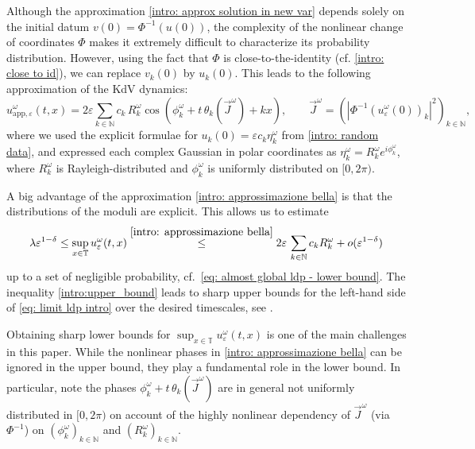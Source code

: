 \documentclass[a4paper,10pt,reqno]{article}
\theoremstyle{definition}
\theoremstyle{plain}
\theoremstyle{plain}
\theoremstyle{definition}
\theoremstyle{plain}
\theoremstyle{plain}
\theoremstyle{plain}
\theoremstyle{definition}
\theoremstyle{definition}
\def \N{\mathbb N}
\def \T{\mathbb{T}}
\begin{document}
Although the approximation \eqref{intro: approx solution in new var} depends solely on the initial datum $v(0)=\Phi^{-1}(u(0))$, the complexity of the nonlinear change of coordinates $\Phi$ makes it extremely difficult to characterize its probability distribution. However, using the fact that $\Phi$ is close-to-the-identity (cf. \eqref{intro: close to id}), we can replace $v_k(0)$ by $u_k(0)$. This leads to the following approximation of the KdV dynamics:
\begin{equation} \label{intro: approssimazione bella}
u_{\mathrm{app},\varepsilon}^{\omega}(t,x) = 2 \varepsilon \sum_{k \in \N} c_k \, R_k^{\omega} \cos \left ( \phi_k^{\omega} + t \,\theta_k( \vec{J}^{\omega}) + kx \right ), \qquad \vec{J}^{\omega} = ( |\Phi^{-1} (u_{\varepsilon}^{\omega}(0))_k|^2 )_{k\in\N},
\end{equation}
where we used the explicit formulae for $u_k(0) = \varepsilon c_k \eta_k^{\omega}$ from \eqref{intro: random data}, and expressed each complex Gaussian in polar coordinates as $\eta_k^{\omega}=R_k^{\omega} e^{i\phi_k^{\omega}}$, where $R_k^{\omega}$ is Rayleigh-distributed and $\phi_k^{\omega}$ is uniformly distributed on $[0,2\pi)$.

A big advantage of the approximation \eqref{intro: approssimazione bella} is that the distributions of the moduli are explicit. This allows us to estimate
\begin{equation}\label{intro:upper_bound}
\lambda \varepsilon^{1-\delta}\leq \sup_{x\in\T} u^{\omega}_{\varepsilon}(t,x) \stackrel{\eqref{intro: approssimazione bella}}{\leq} 2\varepsilon\,\sum_{k\in\N} c_k R_k^{\omega} + o(\varepsilon^{1-\delta})
\end{equation}
up to a set of negligible probability, cf.~\eqref{eq: almost global ldp - lower bound}. The inequality \eqref{intro:upper_bound} leads to sharp upper bounds for the left-hand side of \eqref{eq: limit ldp intro} over the desired timescales, see .

\smallskip

Obtaining sharp lower bounds for $\sup_{x\in\T} u^{\omega}_{\varepsilon}(t,x)$ is one of the main challenges in this paper. While the nonlinear phases in \eqref{intro: approssimazione bella} can be ignored in the upper bound, they play a fundamental role in the lower bound. In particular, note the phases $\phi_k^{\omega} + t \,\theta_k( \vec{J}^{\omega})$ are in general not uniformly distributed in $[0,2\pi)$ on account of the highly nonlinear dependency of $\vec{J}^{\omega}$ (via $\Phi^{-1}$) on $(\phi_k^{\omega})_{k\in\N}$ and $(R_k^{\omega})_{k\in\N}$.
\end{document}
